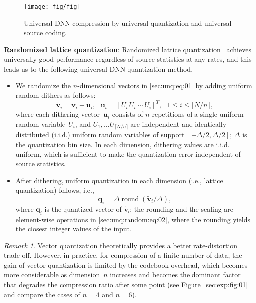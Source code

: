 \documentclass{article}
\theoremstyle{remark}
\newtheorem{remark}{Remark}
\newcommand{\round}{\operatorname{round}}
\begin{document}
\begin{figure}[t!]
\centering
\texttt{[image: fig/fig]}
\caption{Universal DNN compression by universal quantization and universal source coding.\label{sec:unq:random:fig:01}}
\vspace{-1em}
\end{figure}

\textbf{Randomized lattice quantization}: Randomized lattice quantization~\cite{ziv1985universal} achieves universally good performance regardless of source statistics at any rates, and this leads us to the following universal DNN quantization method.

\begin{itemize}[noitemsep,topsep=0em,leftmargin=1.2em]
\item We randomize the $n$-dimensional vectors in \eqref{sec:unq:eq:01} by adding uniform random dithers as follows:
\begin{equation} \label{sec:unq:random:eq:01}
\tilde{\mathbf{v}}_i=\mathbf{v}_i+\mathbf{u}_i,
\ \ \
\mathbf{u}_i=[U_i\ U_i\ \cdots\ U_i]^T,
\ \ \
1\leq i\leq\lceil N/n\rceil,
\end{equation}
where each dithering vector~$\mathbf{u}_i$ consists of $n$ repetitions of a single uniform random variable~$U_i$, and $U_1,\dots U_{\lceil N/n\rceil}$ are independent and identically distributed (i.i.d.) uniform random variables of support $[-\Delta/2,\Delta/2]$; $\Delta$ is the quantization bin size. In each dimension, dithering values are i.i.d. uniform, which is sufficient to make the quantization error independent of source statistics. %
\item After dithering, uniform quantization in each dimension (i.e., lattice quantization) follows, i.e.,
\begin{equation} \label{sec:unq:random:eq:02}
\mathbf{q}_i=\Delta\round(\tilde{\mathbf{v}}_i/\Delta),
\end{equation}
where $\mathbf{q}_i$ is the quantized vector of $\tilde{\mathbf{v}}_i$; the rounding and the scaling are element-wise operations in \eqref{sec:unq:random:eq:02}, where the rounding yields the closest integer values of the input.
\end{itemize}

\begin{remark} \label{sec:unq:remark:01}
Vector quantization theoretically provides a better rate-distortion trade-off. However, in practice, for compression of a finite number of data, the gain of vector quantization is limited by the codebook overhead, which becomes more considerable as dimension~$n$ increases and becomes the dominant factor that degrades the compression ratio after some point (see Figure~\ref{sec:exp:fig:01} and compare the cases of $n=4$ and $n=6$).
\end{remark}
\end{document}
